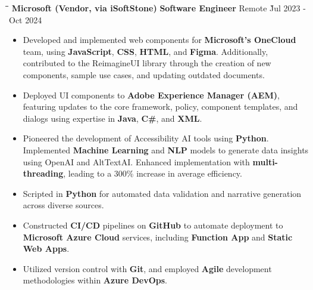 \documentclass{res}
\begin{document}
\begin{resume}
    \vspace{0.00in}	
    \begin{tabbing}
    \hspace{2.8in}\= \hspace{1.8in}\= \hspace{1.2in}\= \kill %
    {\bf Microsoft (Vendor, via iSoftStone)} \> {\bf Software Engineer}  \>  
                                    Remote    \` Jul 2023 - Oct 2024\\
    \end{tabbing}\vspace{-20pt}      %
    \vspace{+0.1in}
    \begin{itemize} \itemsep 1.5pt %
    \item Developed and implemented web components for {\bf Microsoft's OneCloud} team, using {\bf JavaScript}, 
        {\bf CSS}, {\bf HTML}, and {\bf Figma}. Additionally, contributed to the ReimagineUI library 
        through the creation of new components, sample use cases, and updating outdated documents.
    \item Deployed UI components to {\bf Adobe Experience Manager (AEM)}, featuring updates to the core framework, 
        policy, component templates, and dialogs using expertise in {\bf Java}, {\bf C\#}, and {\bf XML}.
    \item Pioneered the development of Accessibility AI tools using {\bf Python}. 
        Implemented {\bf Machine Learning} and {\bf NLP} models to generate data insights using OpenAI and AltTextAI.
        Enhanced implementation with {\bf multi-threading}, leading to a 300\% increase in average efficiency.
    \item Scripted in {\bf Python} for automated data validation and narrative generation across diverse sources.
    \item Constructed {\bf CI/CD} pipelines on {\bf GitHub} to automate deployment to 
        {\bf Microsoft Azure Cloud} services, including {\bf Function App} and {\bf Static Web Apps}.
    \item Utilized version control with {\bf Git}, and employed {\bf Agile} 
        development methodologies within {\bf Azure DevOps}.
    \end{itemize}



\end{resume}
\end{document}
